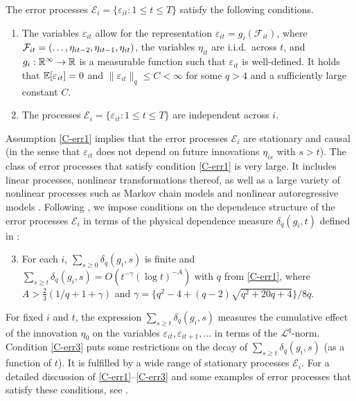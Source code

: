 \documentclass[12pt]{article}
\makeatletter
\renewcommand{\eqref}[1]{\tagform@{\ref{#1}}}
\makeatother
\begin{document}
The error processes $\mathcal{E}_i = \{ \varepsilon_{it}: 1 \le t \le T\}$ satisfy the following conditions. 
\begin{enumerate}[label=(C\arabic*),leftmargin=1.05cm, itemsep=0pt, parsep=0pt]
\item \label{C-err1} 
The variables $\varepsilon_{it}$ allow for the representation $\varepsilon_{it} = g_i(\mathcal{F}_{it})$, where $\mathcal{F}_{it} = (\ldots,\eta_{it-2}, \linebreak \eta_{it-1},\eta_{it})$, the variables $\eta_{it}$ are i.i.d.\ across $t$, and $g_i: \mathbb{R}^\infty \rightarrow \mathbb{R}$ is a measurable function such that $\varepsilon_{it}$ is well-defined. It holds that $\mathbb{E}[\varepsilon_{it}] = 0$ and $\| \varepsilon_{it} \|_q \le C < \infty$ for some $q > 4$ and a sufficiently large constant $C$. 
\item \label{C-err2} The processes $\mathcal{E}_i = \{ \varepsilon_{it}: 1 \le t \le T\}$ are independent across $i$.
\end{enumerate}
Assumption \ref{C-err1} implies that the error processes $\mathcal{E}_i$ are stationary and causal (in the sense that $\varepsilon_{it}$ does not depend on future innovations $\eta_{is}$ with $s>t$). The class of error processes that satisfy condition \ref{C-err1} is very large. It includes linear processes, nonlinear transformations thereof, as well as a large variety of nonlinear processes such as Markov chain models and nonlinear autoregressive models \citep[][]{Wu2016}. Following \cite{Wu2005}, we impose conditions on the dependence structure of the error processes $\mathcal{E}_i$ in terms of the physical dependence measure $\delta_q(g_i, t)$ defined in \eqref{eq:physical_dep}: %
\begin{enumerate}[label=(C\arabic*),leftmargin=1.05cm, itemsep=0pt, parsep=0pt]
\setcounter{enumi}{2}
\item \label{C-err3} For each $i$, $\sum\nolimits_{s \ge 0} \delta_q(g_i, s)$ is finite and $\sum\nolimits_{s \ge t} \delta_q(g_i, s) = O ( t^{-\gamma} (\log t)^{-A})$ with $q$ from \ref{C-err1}, where $A > \frac{2}{3} (1/q + 1 + \gamma)$ and $\gamma = \{q^2 - 4 + (q-2) \sqrt{q^2 + 20q + 4}\} / 8q$. 
\end{enumerate}
For fixed $i$ and $t$, the expression $\sum\nolimits_{s \ge t} \delta_q(g_i, s)$ measures the cumulative effect of the innovation $\eta_0$ on the variables $\varepsilon_{it}, \varepsilon_{it+1},\ldots$ in terms of the $\mathcal{L}^q$-norm. Condition \ref{C-err3} puts some restrictions on the decay of $\sum\nolimits_{s \ge t} \delta_q(g_i, s)$ (as a function of $t$). It is fulfilled by a wide range of stationary processes $\mathcal{E}_i$. For a detailed discussion of \ref{C-err1}--\ref{C-err3} and some examples of error processes that satisfy these conditions, see \cite{KhismatullinaVogt2020}.
\end{document}

